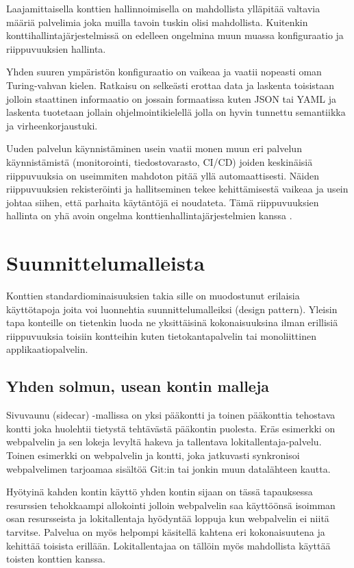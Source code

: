 \documentclass[finnish,gradu]{tktltiki3}
\begin{document}
    Laajamittaisella konttien hallinnoimisella on mahdollista ylläpitää valtavia määriä palvelimia joka muilla tavoin tuskin olisi mahdollista. Kuitenkin konttihallintajärjestelmissä on edelleen ongelmina muun muassa konfiguraatio ja riippuvuuksien hallinta.
    
    Yhden suuren ympäristön konfiguraatio on vaikeaa ja vaatii nopeasti oman Turing-vahvan kielen. Ratkaisu on selkeästi erottaa data ja laskenta toisistaan jolloin staattinen informaatio on jossain formaatissa kuten JSON tai YAML ja laskenta tuotetaan jollain ohjelmointikielellä jolla on hyvin tunnettu semantiikka ja virheenkorjaustuki.
    
    Uuden palvelun käynnistäminen usein vaatii monen muun eri palvelun käynnistämistä (monitorointi, tiedostovarasto, CI/CD) joiden keskinäisiä riippuvuuksia on useimmiten mahdoton pitää yllä automaattisesti. Näiden riippuvuuksien rekisteröinti ja hallitseminen tekee kehittämisestä vaikeaa ja usein johtaa siihen, että parhaita käytäntöjä ei noudateta. Tämä riippuvuuksien hallinta on yhä avoin ongelma konttienhallintajärjestelmien kanssa \cite{borg-omega-kubernetes}.
    
    \section{Suunnittelumalleista}
    
    Konttien standardiominaisuuksien takia sille on muodostunut erilaisia käyttötapoja joita voi luonnehtia suunnittelumalleiksi (design pattern). Yleisin tapa konteille on tietenkin luoda ne yksittäisinä kokonaisuuksina ilman erillisiä riippuvuuksia toisiin kontteihin kuten tietokantapalvelin tai monoliittinen applikaatiopalvelin.
    
    \subsection{Yhden solmun, usean kontin malleja}
    
    Sivuvaunu (sidecar) -mallissa on yksi pääkontti ja toinen pääkonttia tehostava kontti joka huolehtii tietystä tehtävästä pääkontin puolesta. Eräs esimerkki on webpalvelin ja sen lokeja levyltä hakeva ja tallentava lokitallentaja-palvelu. Toinen esimerkki on webpalvelin ja kontti, joka jatkuvasti synkronisoi webpalvelimen tarjoamaa sisältöä Git:in tai jonkin muun datalähteen kautta.
    
    Hyötyinä kahden kontin käyttö yhden kontin sijaan on tässä tapauksessa resurssien tehokkaampi allokointi jolloin webpalvelin saa käyttöönsä isoimman osan resursseista ja lokitallentaja hyödyntää loppuja kun webpalvelin ei niitä tarvitse. Palvelua on myös helpompi käsitellä kahtena eri kokonaisuutena ja kehittää toisista erillään. Lokitallentajaa on tällöin myös mahdollista käyttää toisten konttien kanssa.
    
\end{document}
